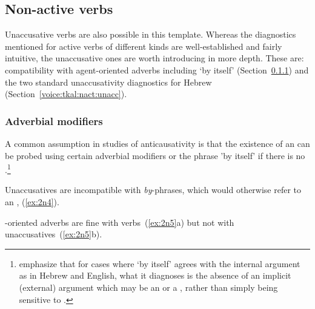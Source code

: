 \begin{exe}
\begin{xlist}
\begin{exe}
\begin{xlist}
\begin{exe}
\begin{xlist}
	
 \z
\z 

	\subsection{Non-active verbs} \label{voice:tkal:nact}
Unaccusative verbs are also possible in this template. Whereas the diagnostics mentioned for active verbs of different kinds are well-established and fairly intuitive, the unaccusative ones are worth introducing in more depth. These are: compatibility with agent-oriented adverbs including `by itself’ (Section~\ref{voice:tkal:nact:adv}) and the two standard unaccusativity diagnostics for Hebrew (Section~\ref{voice:tkal:nact:unacc}).

		\subsubsection{Adverbial modifiers} \label{voice:tkal:nact:adv}
A common assumption in studies of anticausativity is that the existence of an  can be probed using certain adverbial modifiers or the phrase 'by itself' if there is no  \citep{unaccusativity95,alexiadouanagnostopoulou04,layering15,alexiadoudoron12,koontzgarboden09,kastner17gjgl}.\footnote{\cite{layering15} emphasize that for cases where `by itself' agrees with the internal argument as in Hebrew and English, what it diagnoses is the absence of an implicit (external) argument which may be an  or a , rather than simply being sensitive to .} 

Unaccusatives are incompatible with \emph{by}-phrases, which would otherwise refer to an , (\ref{ex:2n4}).
 \begin{exe}
 \label{ex:2n4}
	
 \z 

-oriented adverbs are fine with  verbs~(\ref{ex:2n5}a) but not with unaccusatives~(\ref{ex:2n5}b).
 \begin{exe}
 \ex  \label{ex:2n5}
 \begin{xlist} 
		

\end{xlist}
\end{exe}
\end{exe}
\end{xlist}
\end{exe}
\end{xlist}
\end{exe}
\end{xlist}
\end{exe}
